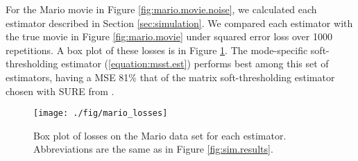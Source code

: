 For the Mario movie in Figure \ref{fig:mario.movie.noise}, we calculated each estimator described in Section \ref{sec:simulation}. We compared each estimator with the true movie in Figure \ref{fig:mario.movie} under squared error loss over 1000 repetitions. A box plot of these losses is in Figure \ref{fig:mario.losses}. The mode-specific soft-thresholding estimator (\ref{equation:msst.est}) performs best among this set of estimators, having a MSE 81\% that of the matrix soft-thresholding estimator chosen with SURE from \cite{candes2013unbiased}.


\begin{figure}
\begin{center}
\texttt{[image: ./fig/mario\_losses]}
\caption{Box plot of losses on the Mario data set for each estimator. Abbreviations are the same as in Figure \ref{fig:sim.results}.}
\label{fig:mario.losses}
\end{center}
\end{figure}